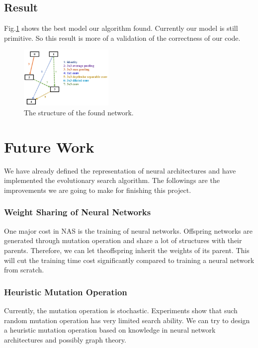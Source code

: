 \documentclass[conference]{IEEEtran}
\begin{document}
 \subsection{Result}

 Fig.\ref{found_artc} shows the best model our algorithm found. Currently our model is still primitive. So this result is more of a validation of the correctness of our code.

\begin{figure}[H]
 	\centering
 	\includegraphics[width=0.4\textwidth]{figures/cellStruct.png}
   \caption{The structure of the found network. }\label{fig:digit}
   \label{found_artc}
  \end{figure}

  

 \section{Future Work}  

 We have already defined the representation of neural architectures and have implemented the evolutionary search algorithm. The followings are the improvements we are going to make for finishing this project.
 
  
  \subsubsection{Weight Sharing of Neural Networks}    
  One major cost in NAS is the training of neural networks. Offspring networks are generated through mutation operation and share a lot of structures with their parents. Therefore, we can let theoffspring inherit the weights of its parent. This will cut the training time cost significantly compared to training a neural network from scratch.
  
  \subsubsection{Heuristic Mutation Operation}
  Currently, the mutation operation is stochastic. Experiments show that such random mutation operation has very limited search ability. We can try to design a heuristic mutation operation based on knowledge in neural network architectures and possibly graph theory.
  
\end{document}
